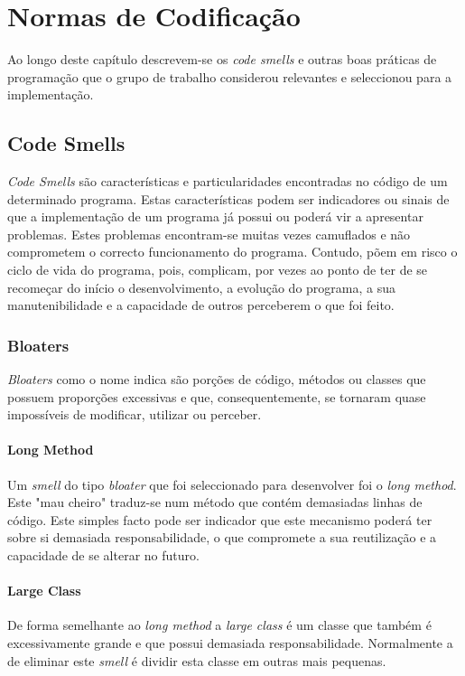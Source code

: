 \chapter{Normas de Codificação}

\hspace{5mm} Ao longo deste capítulo descrevem-se os \textit{code smells} e outras boas práticas de programação que o grupo de trabalho considerou relevantes e seleccionou para a implementação.

\section{Code Smells}

\hspace{5mm} \textit{Code Smells} são características e particularidades encontradas no código de um determinado programa. Estas características podem ser indicadores ou sinais de que a implementação de um programa já possui ou poderá vir a apresentar problemas. Estes problemas encontram-se muitas vezes camuflados e não comprometem o correcto funcionamento do programa. Contudo, põem em risco o ciclo de vida do programa, pois, complicam, por vezes ao ponto de ter de se recomeçar do início o desenvolvimento, a evolução do programa, a sua manutenibilidade e a capacidade de outros perceberem o que foi feito.

\subsection{Bloaters}
\hspace{5mm} \textit{Bloaters} como o nome indica são porções de código, métodos ou classes que possuem proporções excessivas e que, consequentemente, se tornaram quase impossíveis de modificar, utilizar ou perceber.

\subsubsection{Long Method}
\hspace{5mm} Um \textit{smell} do tipo \textit{bloater} que foi seleccionado para desenvolver foi o \textit{long method}. Este "mau cheiro" traduz-se num método que contém demasiadas linhas de código. Este simples facto pode ser indicador que este mecanismo poderá ter sobre si demasiada responsabilidade, o que compromete a sua reutilização e a capacidade de se alterar no futuro.


\subsubsection{Large Class}
\hspace{5mm} De forma semelhante ao \textit{long method} a \textit{large class} é um classe que também é excessivamente grande e que possui demasiada responsabilidade. Normalmente a de eliminar este \textit{smell} é dividir esta classe em outras mais pequenas.


